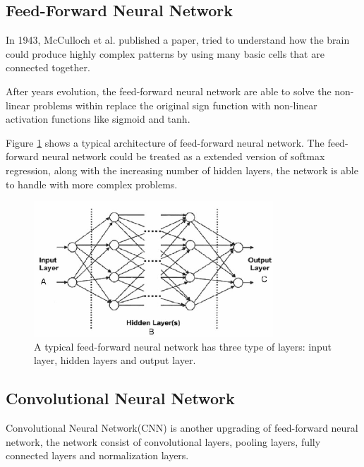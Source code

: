 \documentclass[article]{aaltoseries}
\begin{document}
\subsection{Feed-Forward Neural Network}

In 1943, McCulloch et al. published a paper\cite{mcculloch1943logical}, tried to understand how the brain could 
produce highly complex patterns by using many basic cells that are connected together.

After years evolution, the feed-forward neural network are able to solve the non-linear problems within replace
the original sign function with non-linear activation functions like sigmoid and tanh.

Figure \ref{fig:feed_forward} shows a typical architecture of feed-forward neural network. The feed-forward neural
network could be treated as a extended version of softmax regression, along with the increasing number of hidden layers, 
the network is able to handle with more complex problems.

\begin{figure}[t!]
  \begin{center}
    \includegraphics[width=0.8\textwidth]{figures/feedforward_neural_network}
    \caption{A typical feed-forward neural network has three type of layers: input layer, hidden layers and output layer.}
    \label{fig:feed_forward}
  \end{center}
\end{figure}

\subsection{Convolutional Neural Network}

Convolutional Neural Network(CNN) is another upgrading of feed-forward neural network, the network consist of 
convolutional layers, pooling layers, fully connected layers and normalization layers.
\end{document}
